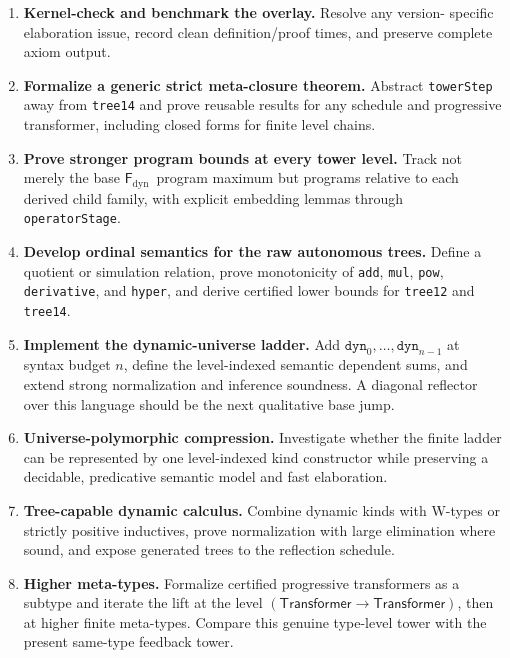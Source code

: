 \documentclass[11pt]{article}
\theoremstyle{definition}
\newcommand{\Transformer}{\ensuremath{\mathsf{Transformer}}}
\newcommand{\Fd}{\ensuremath{\mathsf{F}_{\mathrm{dyn}}}}
\newcommand{\lean}[1]{\texttt{#1}}
\begin{document}
\begin{enumerate}[leftmargin=2.1em]
  \item \textbf{Kernel-check and benchmark the overlay.}  Resolve any version-
  specific elaboration issue, record clean definition/proof times, and preserve
  complete axiom output.

  \item \textbf{Formalize a generic strict meta-closure theorem.}  Abstract
  \lean{towerStep} away from \lean{tree14} and prove reusable results for any
  schedule and progressive transformer, including closed forms for finite
  level chains.

  \item \textbf{Prove stronger program bounds at every tower level.}  Track
  not merely the base \Fd\ program maximum but programs relative to each
  derived child family, with explicit embedding lemmas through
  \lean{operatorStage}.

  \item \textbf{Develop ordinal semantics for the raw autonomous trees.}
  Define a quotient or simulation relation, prove monotonicity of \lean{add},
  \lean{mul}, \lean{pow}, \lean{derivative}, and \lean{hyper}, and derive
  certified lower bounds for \lean{tree12} and \lean{tree14}.

  \item \textbf{Implement the dynamic-universe ladder.}  Add
  $\mathtt{dyn}_0,\ldots,\mathtt{dyn}_{n-1}$ at syntax budget $n$, define the
  level-indexed semantic dependent sums, and extend strong normalization and
  inference soundness.  A diagonal reflector over this language should be the
  next qualitative base jump.

  \item \textbf{Universe-polymorphic compression.}  Investigate whether the
  finite ladder can be represented by one level-indexed kind constructor while
  preserving a decidable, predicative semantic model and fast elaboration.

  \item \textbf{Tree-capable dynamic calculus.}  Combine dynamic kinds with
  W-types or strictly positive inductives, prove normalization with large
  elimination where sound, and expose generated trees to the reflection
  schedule.

  \item \textbf{Higher meta-types.}  Formalize certified progressive
  transformers as a subtype and iterate the lift at the level
  $(\Transformer\to\Transformer)$, then at higher finite meta-types.  Compare
  this genuine type-level tower with the present same-type feedback tower.


\end{enumerate}
\end{document}

